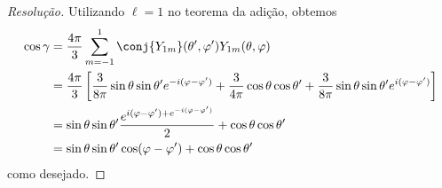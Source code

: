 \begin{proof}[Resolução]
    Utilizando \(\ell = 1\) no teorema da adição, obtemos
    \begin{align*}
        \cos \gamma &= \frac{4\pi}{3} \sum_{m = -1}^{1} \conj{Y_{1m}}(\theta', \varphi') Y_{1m}(\theta,\varphi)\\
                    &= \frac{4\pi}{3}\left[\frac{3}{8\pi} \sin\theta \sin\theta' e^{-i(\varphi-\varphi')} + \frac{3}{4\pi}\cos\theta \cos\theta' + \frac{3}{8\pi}\sin\theta \sin\theta' e^{i(\varphi - \varphi')}\right]\\
                    &= \sin\theta\sin\theta'\frac{e^{i(\varphi - \varphi') + e^{-i(\varphi - \varphi')}}}{2} + \cos\theta \cos\theta'\\
                    &= \sin\theta\sin\theta' \cos(\varphi - \varphi') + \cos\theta \cos\theta'
    \end{align*}
    como desejado.


\end{proof}
